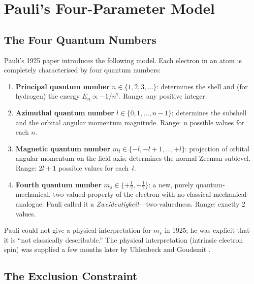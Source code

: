\documentclass[12pt]{article}
\begin{document}
\section{Pauli's Four-Parameter Model}
\label{sec:model}

\subsection{The Four Quantum Numbers}

Pauli's 1925 paper \citep{Pauli1925} introduces the following model.  Each
electron in an atom is completely characterised by four quantum numbers:

\begin{enumerate}
  \item \textbf{Principal quantum number} $n \in \{1,2,3,\ldots\}$:
    determines the shell and (for hydrogen) the energy $E_n \propto -1/n^2$.
    Range: any positive integer.

  \item \textbf{Azimuthal quantum number} $l \in \{0,1,\ldots,n-1\}$:
    determines the subshell and the orbital angular momentum magnitude.
    Range: $n$ possible values for each $n$.

  \item \textbf{Magnetic quantum number} $m_l \in \{-l,-l{+}1,\ldots,+l\}$:
    projection of orbital angular momentum on the field axis; determines the
    normal Zeeman sublevel.  Range: $2l+1$ possible values for each~$l$.

  \item \textbf{Fourth quantum number} $m_s \in \{+\tfrac{1}{2},
    -\tfrac{1}{2}\}$: a new, purely quantum-mechanical, two-valued
    property of the electron with no classical mechanical
    analogue.  Pauli called it a \emph{Zweideutigkeit}---two-valuedness.
    Range: exactly 2 values.
\end{enumerate}

\noindent Pauli could not give a physical interpretation for $m_s$ in 1925; he
was explicit that it is ``not classically describable.''  The physical
interpretation (intrinsic electron spin) was supplied a few months later by
Uhlenbeck and Goudsmit \citeyearpar{UhlenbeckGoudsmit1925}.

\subsection{The Exclusion Constraint}
\end{document}
